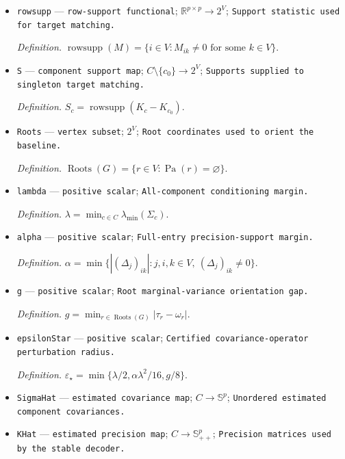 \documentclass{article}
\begin{document}
\begin{itemize}
  \par\smallskip\noindent\emph{Definition.} \(\Delta_j=K_j-K_0\) in a truth-labeled representation.
  \item \texttt{rowsupp} --- \texttt{row-\allowbreak{}support functional}; \(\mathbb R^{p\times p}\to2^V\); \texttt{Support statistic used for target matching.}
  \par\smallskip\noindent\emph{Definition.} \(\operatorname{rowsupp}(M)=\{i\in V: M_{ik}\neq0\text{ for some }k\in V\}\).
  \item \texttt{S} --- \texttt{component support map}; \(C\setminus\{c_0\}\to2^V\); \texttt{Supports supplied to singleton target matching.}
  \par\smallskip\noindent\emph{Definition.} \(S_c=\operatorname{rowsupp}(K_c-K_{c_0})\).
  \item \texttt{Roots} --- \texttt{vertex subset}; \(2^V\); \texttt{Root coordinates used to orient the baseline.}
  \par\smallskip\noindent\emph{Definition.} \(\operatorname{Roots}(G)=\{r\in V:\operatorname{Pa}(r)=\varnothing\}\).
  \item \texttt{lambda} --- \texttt{positive scalar}; \texttt{All-\allowbreak{}component conditioning margin.}
  \par\smallskip\noindent\emph{Definition.} \(\lambda=\min_{c\in C}\lambda_{\min}(\Sigma_c)\).
  \item \texttt{alpha} --- \texttt{positive scalar}; \texttt{Full-\allowbreak{}entry precision-\allowbreak{}support margin.}
  \par\smallskip\noindent\emph{Definition.} \(\alpha=\min\{|(\Delta_j)_{ik}|:j,i,k\in V,\ (\Delta_j)_{ik}\neq0\}\).
  \item \texttt{g} --- \texttt{positive scalar}; \texttt{Root marginal-\allowbreak{}variance orientation gap.}
  \par\smallskip\noindent\emph{Definition.} \(g=\min_{r\in\operatorname{Roots}(G)}|\tau_r-\omega_r|\).
  \item \texttt{epsilonStar} --- \texttt{positive scalar}; \texttt{Certified covariance-\allowbreak{}operator perturbation radius.}
  \par\smallskip\noindent\emph{Definition.} \(\varepsilon_{\star}=\min\{\lambda/2,\alpha\lambda^2/16,g/8\}\).
  \item \texttt{SigmaHat} --- \texttt{estimated covariance map}; \(C\to\mathbb S^p\); \texttt{Unordered estimated component covariances.}
  \item \texttt{KHat} --- \texttt{estimated precision map}; \(C\to\mathbb S_{++}^p\); \texttt{Precision matrices used by the stable decoder.}

\end{itemize}
\end{document}
